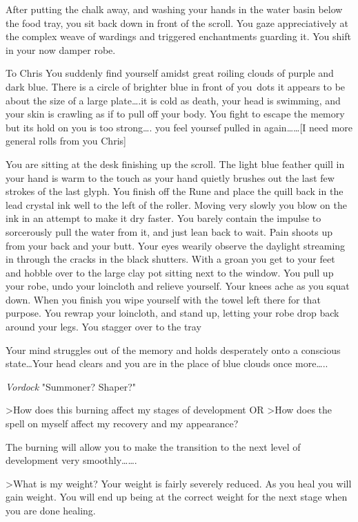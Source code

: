{{After putting the chalk away, and washing your hands in the water basin 
below the food tray, you sit back down in front of the scroll. You gaze 
appreciatively at the complex weave of wardings and triggered 
enchantments guarding it. You shift in your now damper robe.

{To Chris You suddenly find yourself amidst great roiling clouds of 
purple and dark blue. There is a circle of brighter blue in front of you\
dots it appears to be about the size of a large plate\dots.it is cold as 
death, your head is swimming, and your skin is crawling as if to pull 
off your body. You fight to escape the memory but its hold on you is too 
strong\dots. you feel yoursef pulled in again\dots\dots}[I need more 
general rolls from you Chris]

You are sitting at the desk finishing up the scroll. The light blue 
feather quill in your hand is warm to the touch as your hand quietly 
brushes out the last few strokes of the last glyph. You finish off the 
Rune and place the quill back in the lead crystal ink well to the left 
of the roller. Moving very slowly you blow on the ink in an attempt to 
make it dry faster. You barely contain the impulse to sorcerously pull 
the water from it, and just lean back to wait. Pain shoots up from your 
back and your butt. Your eyes wearily observe the daylight streaming in 
through the cracks in the black shutters. With a groan you get to your 
feet and hobble over to the large clay pot sitting next to the window. 
You pull up your robe, undo your loincloth and relieve yourself. Your 
knees ache as you squat down. When you finish you wipe yourself with the 
towel left there for that purpose. You re\-wrap your loincloth, and 
stand up, letting your robe drop back around your legs. You stagger over 
to the tray

{Your mind struggles out of the memory and holds desperately onto a 
conscious state\dots Your head clears and you are in the place of blue 
clouds once more\dots..}

{\em Vordock}
"Summoner? Shaper?"

>How does this burning affect my stages of development OR
>How does the spell on myself affect my recovery and my appearance?

The burning will allow you to make the transition to the next level of 
development very smoothly\dots\dots.

>What is my weight?
Your weight is fairly severely reduced. As you heal you will gain 
weight. You will end up being at the correct weight for the next stage 
when you are done healing.

}}
